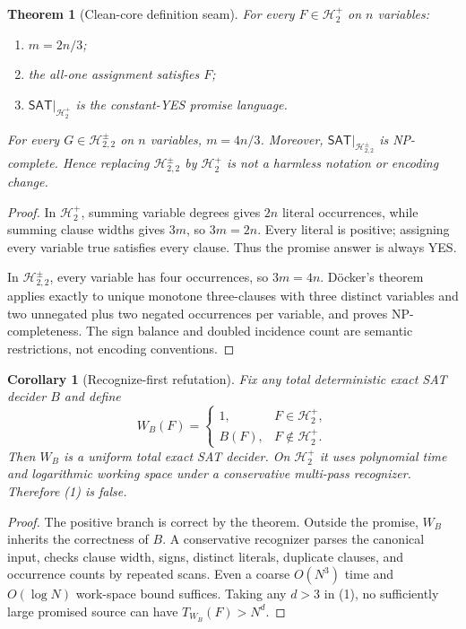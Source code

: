 \documentclass[11pt]{article}
\newtheorem{theorem}{Theorem}
\newtheorem{corollary}{Corollary}
\newcommand{\SAT}{\mathsf{SAT}}
\newcommand{\Hplus}{\mathcal H^{+}_{2}}
\newcommand{\Hsigned}{\mathcal H^{\pm}_{2,2}}
\begin{document}
\begin{theorem}[Clean-core definition seam]
For every $F\in\Hplus$ on $n$ variables:
\begin{enumerate}
\item $m=2n/3$;
\item the all-one assignment satisfies $F$;
\item $\SAT|_{\Hplus}$ is the constant-YES promise language.
\end{enumerate}
For every $G\in\Hsigned$ on $n$ variables, $m=4n/3$.  Moreover,
$\SAT|_{\Hsigned}$ is NP-complete.
Hence replacing $\Hsigned$ by $\Hplus$ is not a harmless notation or
encoding change.
\end{theorem}

\begin{proof}
In $\Hplus$, summing variable degrees gives $2n$ literal occurrences,
while summing clause widths gives $3m$, so $3m=2n$.  Every literal is
positive; assigning every variable true satisfies every clause.  Thus the
promise answer is always YES.

In $\Hsigned$, every variable has four occurrences, so
$3m=4n$.  D\"ocker's theorem applies exactly to unique monotone
three-clauses with three distinct variables and two unnegated plus two
negated occurrences per variable, and proves NP-completeness.  The sign
balance and doubled incidence count are semantic restrictions, not encoding
conventions.
\end{proof}

\begin{corollary}[Recognize-first refutation]
Fix any total deterministic exact SAT decider $B$ and define
\[
 W_B(F)=
 \begin{cases}
  1,&F\in\Hplus,\\
  B(F),&F\notin\Hplus.
 \end{cases}
\]
Then $W_B$ is a uniform total exact SAT decider.  On $\Hplus$ it uses
polynomial time and logarithmic working space under a conservative
multi-pass recognizer.  Therefore (1) is false.
\end{corollary}

\begin{proof}
The positive branch is correct by the theorem.  Outside the promise,
$W_B$ inherits the correctness of $B$.  A conservative recognizer parses
the canonical input, checks clause width, signs, distinct literals,
duplicate clauses, and occurrence counts by repeated scans.  Even a coarse
$O(N^3)$ time and $O(\log N)$ work-space bound suffices.  Taking any
$d>3$ in (1), no sufficiently large promised source can have
$T_{W_B}(F)>N^d$.
\end{proof}
\end{document}
